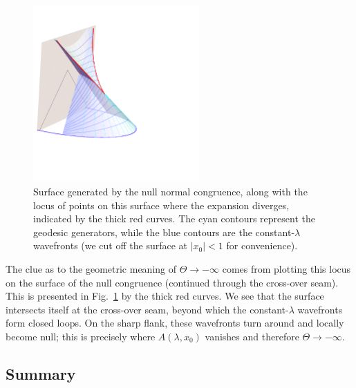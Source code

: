 \documentclass[12pt]{article}
\begin{document}
\begin{figure}[t]
\begin{center}
\includegraphics[width=2.5in]{InftExpansion}
\caption{
Surface generated by the null normal congruence, along with the locus of points on this surface where the expansion diverges, indicated by the thick red curves.  The cyan contours represent the geodesic generators, while the blue contours are the constant-$\lambda$ wavefronts (we cut off the surface at $|x_0| < 1$ for convenience).
}
\label{f:InftExpansion}
\end{center}
\end{figure}
%

The clue as to the geometric meaning of $\Theta \to -\infty$ comes from plotting this locus on the surface of the null congruence (continued through the cross-over seam).  This is presented in Fig.~\ref{f:InftExpansion} by the thick red curves.  We see that the surface intersects itself at the cross-over seam, beyond which the constant-$\lambda$ wavefronts form closed loops.  On the sharp flank, these wavefronts turn around and locally become null; this is precisely where $A(\lambda,x_0)$ vanishes and therefore $\Theta \to -\infty$.  

\subsection{Summary}\label{p:ellipsesummary}
\end{document}
